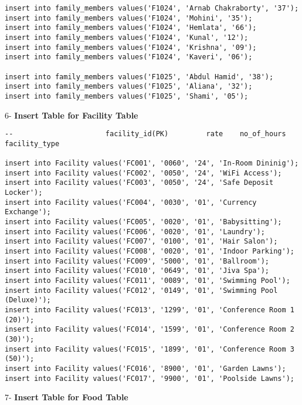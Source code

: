 \documentclass[a4,12pt]{report}
\begin{document}
\begin{lstlisting}
insert into family_members values('F1024', 'Arnab Chakraborty', '37');
insert into family_members values('F1024', 'Mohini', '35');
insert into family_members values('F1024', 'Hemlata', '66');
insert into family_members values('F1024', 'Kunal', '12');
insert into family_members values('F1024', 'Krishna', '09');
insert into family_members values('F1024', 'Kaveri', '06');

insert into family_members values('F1025', 'Abdul Hamid', '38');
insert into family_members values('F1025', 'Aliana', '32');
insert into family_members values('F1025', 'Shami', '05');

\end{lstlisting}

\begin{flushleft}
6- \textbf{ Insert Table for Facility Table}
\end{flushleft}

\begin{lstlisting}
--						facility_id(PK)			rate	no_of_hours		facility_type

insert into Facility values('FC001', '0060', '24', 'In-Room Dininig');
insert into Facility values('FC002', '0050', '24', 'WiFi Access');
insert into Facility values('FC003', '0050', '24', 'Safe Deposit Locker');
insert into Facility values('FC004', '0030', '01', 'Currency Exchange');
insert into Facility values('FC005', '0020', '01', 'Babysitting');
insert into Facility values('FC006', '0020', '01', 'Laundry');
insert into Facility values('FC007', '0100', '01', 'Hair Salon');
insert into Facility values('FC008', '0020', '01', 'Indoor Parking');
insert into Facility values('FC009', '5000', '01', 'Ballroom');
insert into Facility values('FC010', '0649', '01', 'Jiva Spa');
insert into Facility values('FC011', '0089', '01', 'Swimming Pool');
insert into Facility values('FC012', '0149', '01', 'Swimming Pool (Deluxe)');
insert into Facility values('FC013', '1299', '01', 'Conference Room 1 (20)');
insert into Facility values('FC014', '1599', '01', 'Conference Room 2 (30)');
insert into Facility values('FC015', '1899', '01', 'Conference Room 3 (50)');
insert into Facility values('FC016', '8900', '01', 'Garden Lawns');
insert into Facility values('FC017', '9900', '01', 'Poolside Lawns');

\end{lstlisting}

\begin{flushleft}
7- \textbf{ Insert Table for Food Table}
\end{flushleft}
\end{document}
